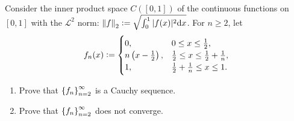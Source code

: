 \documentclass[11pt,a4paper]{article}
\begin{document}
\begin{exercise}
  Consider the inner product space $C([0,1])$ of the continuous functions
  on $[0,1]$ with the $\mathcal L^2$ norm:
  $\norm{f}_2 := \sqrt{\int_{0}^{1} |f(x)|^2 \dx}$.
  For $n \geq 2$, let
  \[
    f_n(x) :=
    \begin{cases}
      0, &0 \le x \le \half, \\
      n \del{x - \half}, &\half \le x \le \half + \frac{1}{n}, \\
      1, &\half + \frac{1}{n} \le x \le 1.
    \end{cases}
  \]
  \begin{enumerate}
    \item[(1)] Prove that $\left\{f_n\right\}_{n=2}^{\infty}$ is a Cauchy sequence.
    \item[(2)] Prove that $\left\{f_n\right\}_{n=2}^{\infty}$ does not converge.
  \end{enumerate}
\end{exercise}
\end{document}

